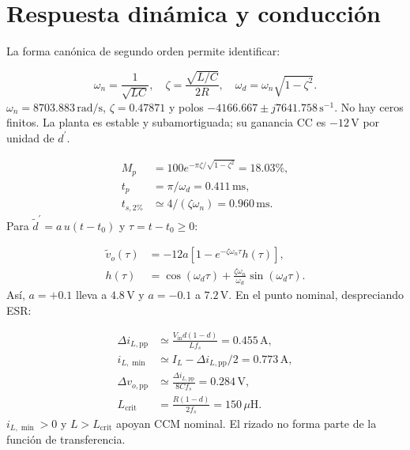 \documentclass[conference,letterpaper]{IEEEtran}
\begin{document}
\section{Respuesta dinámica y conducción}
La forma canónica de segundo orden \cite{dynamics} permite identificar:

\begin{equation}\label{eq:dynamic}\omega_n=\frac1{\sqrt{LC}},\quad\zeta=\frac{\sqrt{L/C}}{2R},\quad\omega_d=\omega_n\sqrt{1-\zeta^2}.\end{equation}
$\omega_n=8703.883\,\mathrm{rad/s}$, $\zeta=0.47871$ y polos $-4166.667\pm j7641.758\,\mathrm{s}^{-1}$. No hay ceros finitos. La planta es estable y subamortiguada; su ganancia CC es $-12\,\mathrm{V}$ por unidad de $d^{\prime}$.

\begin{equation}\label{eq:stepmetrics}\begin{aligned}M_p&=100e^{-\pi\zeta/\sqrt{1-\zeta^2}}=18.03\%,\\t_p&=\pi/\omega_d=0.411\,\mathrm{ms},\\t_{s,2\%}&\simeq4/(\zeta\omega_n)=0.960\,\mathrm{ms}.\end{aligned}\end{equation}
Para $\tilde d^{\prime}=a\,u(t-t_0)$ y $\tau=t-t_0\geq0$:

\begin{equation}\label{eq:response}\begin{aligned}\tilde v_o(\tau)&=-12a[1-e^{-\zeta\omega_n\tau}h(\tau)],\\h(\tau)&=\cos(\omega_d\tau)+\frac{\zeta\omega_n}{\omega_d}\sin(\omega_d\tau).\end{aligned}\end{equation}
Así, $a=+0.1$ lleva a $4.8\,\mathrm{V}$ y $a=-0.1$ a $7.2\,\mathrm{V}$. En el punto nominal, despreciando ESR:

\begin{equation}\label{eq:ripple}\begin{aligned}\Delta i_{L,\mathrm{pp}}&\simeq\frac{V_{\mathrm{in}}d(1-d)}{Lf_s}=0.455\,\mathrm{A},\\i_{L,\min}&\simeq I_L-\Delta i_{L,\mathrm{pp}}/2=0.773\,\mathrm{A},\\\Delta v_{o,\mathrm{pp}}&\simeq\frac{\Delta i_{L,\mathrm{pp}}}{8Cf_s}=0.284\,\mathrm{V},\\L_{\mathrm{crit}}&=\frac{R(1-d)}{2f_s}=150\,\mu\mathrm{H}.\end{aligned}\end{equation}
$i_{L,\min}>0$ y $L>L_{\mathrm{crit}}$ apoyan CCM nominal. El rizado no forma parte de la función de transferencia.
\end{document}
